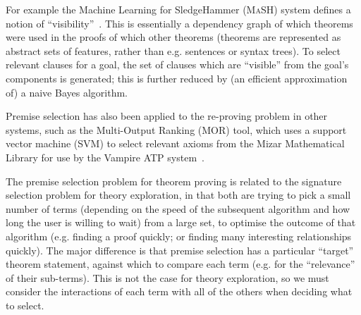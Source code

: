 For example the Machine Learning for SledgeHammer (\textsc{MaSH}) system
defines a notion of ``visibility''~\cite{kuhlwein2013mash}. This is essentially
a dependency graph of which theorems were used in the proofs of which other
theorems (theorems are represented as abstract sets of features, rather than
e.g. sentences or syntax trees). To select relevant clauses for a goal, the
set of clauses which are ``visible'' from the goal's components is generated;
this is further reduced by (an efficient approximation of) a naive Bayes
algorithm.

Premise selection has also been applied to the re-proving problem in other
systems, such as the Multi-Output Ranking (\textsc{MOR}) tool, which uses a
support vector machine (SVM) to select relevant axioms from the Mizar
Mathematical Library for use by the Vampire ATP system~\cite{alama2014premise}.

The premise selection problem for theorem proving is related to the signature
selection problem for theory exploration, in that both are trying to pick a
small number of terms (depending on the speed of the subsequent algorithm and
how long the user is willing to wait) from a large set, to optimise the
outcome of that algorithm (e.g. finding a proof quickly; or finding many
interesting relationships quickly). The major difference is that premise
selection has a particular ``target'' theorem statement, against which to
compare each term (e.g. for the ``relevance'' of their sub-terms). This is not
the case for theory exploration, so we must consider the interactions of each
term with all of the others when deciding what to select.
